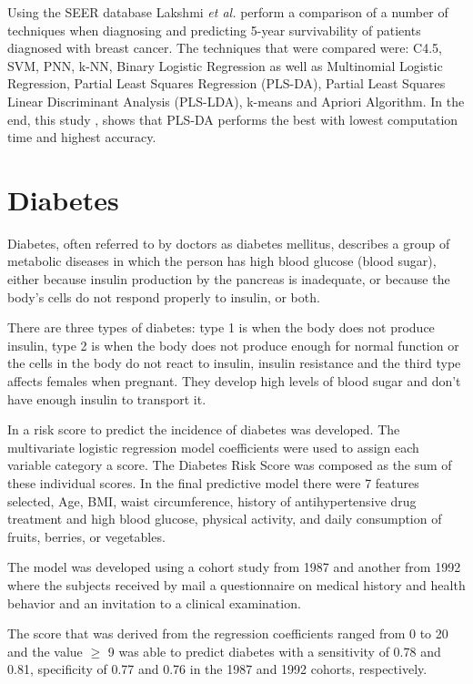 Using the SEER database Lakshmi \emph{et al.} perform a comparison of a number of techniques when diagnosing and predicting 5-year
 survivability of patients diagnosed with breast cancer. The techniques that were compared were: C4.5, SVM, PNN, k-NN, Binary 
 Logistic Regression as well as Multinomial Logistic Regression, Partial Least Squares Regression (PLS-DA), Partial Least Squares 
 Linear Discriminant Analysis (PLS-LDA), k-means and Apriori Algorithm. In the end, this study \cite{Lakshmi2013}, shows that PLS-DA performs the best
 with lowest computation time and highest accuracy.

\section{Diabetes}
\label{section:diabetes}

Diabetes, often referred to by doctors as diabetes mellitus, describes a group of metabolic diseases in which the person 
has high blood glucose (blood sugar), either because insulin production by the pancreas is inadequate, or because the body's
 cells do not respond properly to insulin, or both.

There are three types of diabetes: type 1 is when the body does not produce insulin, type 2 is when the body does not 
produce enough for normal function or the cells in the body do not react to insulin, insulin resistance and the third type 
affects females when pregnant. They develop high levels of blood sugar and don’t have enough insulin to transport it. 

In \cite{Lindstrom2003} a risk score to predict the incidence of diabetes was developed. The multivariate logistic regression model
 coefficients were used to assign each variable category a score. The Diabetes Risk Score was composed as the sum of these individual
 scores. In the final predictive model there were 7 features selected, Age, BMI, waist circumference, history of antihypertensive
 drug treatment and high blood glucose, physical activity, and daily consumption of fruits, berries, or vegetables. 

The model was developed using a cohort study from 1987 and another from 1992 where the subjects received by mail a questionnaire 
on medical history and health behavior and an invitation to a clinical examination.

The score that was derived from the regression coefficients ranged from 0 to 20 and the value $\geq$ 9 was able to predict diabetes
 with a sensitivity of 0.78 and 0.81, specificity of 0.77 and 0.76 in the 1987 and 1992 cohorts, respectively.

